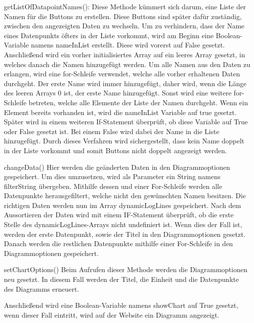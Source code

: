 \begin{compactitem}
    \item getListOfDatapointNames(): Diese Methode kümmert sich darum, eine Liste der Namen für die Buttons zu erstellen. Diese Buttons sind später dafür zuständig, zwischen den angezeigten Daten zu wechseln.
    Um zu verhindern, dass der Name eines Datenpunkts öfters in der Liste vorkommt, wird am Beginn eine Boolean-Variable namens nameInList erstellt. Diese wird vorerst auf False gesetzt.
    Anschließend wird ein vorher initialisiertes Array auf ein leeres Array gesetzt, in welches danach die Namen hinzugefügt werden. Um alle Namen aus den Daten zu erlangen, wird eine for-Schleife verwendet, welche alle vorher erhaltenen Daten durchgeht. Der erste Name wird immer hinzugefügt, daher wird, wenn die Länge des leeren Arrays 0 ist, der erste Name hinzugefügt. Sonst wird eine weitere for-Schleife betreten, welche alle Elemente der Liste der Namen durchgeht. Wenn ein Element bereits vorhanden ist, wird die nameInList Variable auf true gesetzt. Später wird in einem weiteren If-Statement überprüft, ob diese Variable auf True oder False gesetzt ist. Bei einem False wird dabei der Name in die Liste hinzugefügt. Durch dieses Verfahren wird sichergestellt, dass kein Name doppelt in der Liste vorkommt und somit Buttons nicht doppelt angezeigt werden.   
    \item changeData()
    Hier werden die geänderten Daten in den Diagrammoptionen gespeichert. Um dies umzusetzen, wird als Parameter ein String namens filterString übergeben. Mithilfe dessen und einer For-Schleife werden alle Datenpunkte herausgefiltert, welche nicht den gewünschten Namen besitzen. Die richtigen Daten werden nun im Array dynamicLogLines gespeichert. Nach dem Aussortieren der Daten wird mit einem IF-Statement überprüft, ob die erste Stelle des dynamicLogLines-Arrays nicht undefiniert ist. Wenn dies der Fall ist, werden der erste Datenpunkt, sowie der Titel in den Diagrammoptionen gesetzt. Danach werden die restlichen Datenpunkte mithilfe einer For-Schleife in den Diagrammoptionen gespeichert.               
    \item setChartOptions()
    Beim Aufrufen dieser Methode werden die Diagrammoptionen neu gesetzt. In diesem Fall werden der Titel, die Einheit und die Datenpunkte des Diagramms erneuert.       
\end{compactitem}
 
Anschließend wird eine Boolean-Variable namens showChart auf True gesetzt, wenn dieser Fall eintritt, wird auf der Website ein Diagramm angezeigt.
 
